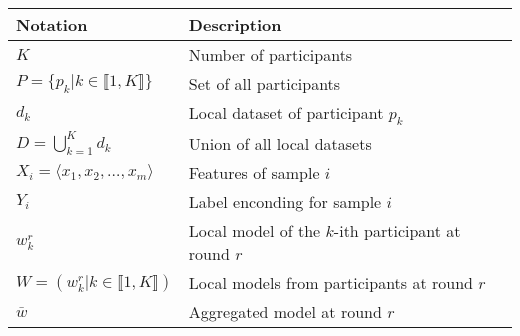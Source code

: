 
\begin{tabular}{ll}
  \toprule %
  \textbf{Notation}                                                   & \textbf{Description} \\
  \midrule %
  $K$                                                                 & Number of participants \\
  $P = \lbrace p_k | k \in \llbracket 1,K \rrbracket \rbrace$         & Set of all participants \\
  $d_k$                                                               & Local dataset of participant $p_k$ \\
  $D = \bigcup_{k=1}^K d_k$                                           & Union of all local datasets \\
  $X_i = \langle x_1, x_2, \dots, x_m \rangle$                        & Features of sample $i$ \\
  $Y_i$                                                               & Label enconding for sample $i$ \\
  $w_k^r$                                                             & Local model of the $k$-ith participant at round $r$ \\
  $W = (w_k^r | k \in \llbracket 1,K \rrbracket)$                     & Local models from participants at round $r$ \\
  $\bar{w}$                                                           & Aggregated model at round $r$ \\
  \bottomrule %
\end{tabular}